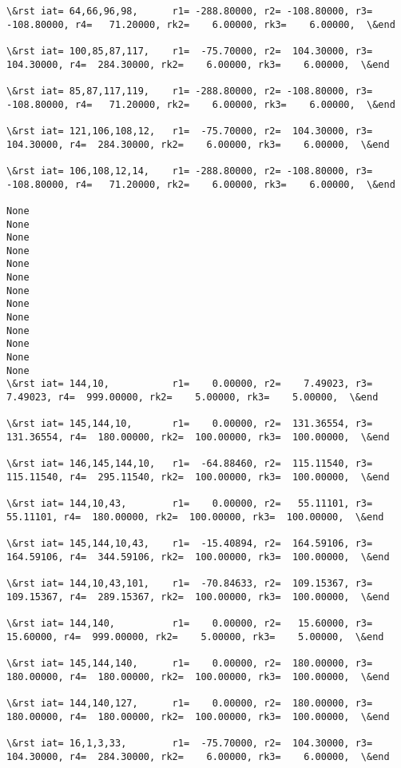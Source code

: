 \documentclass[11pt]{article}
\begin{document}
\begin{Verbatim}[commandchars=\\\{\}]
\&rst iat= 64,66,96,98,      r1= -288.80000, r2= -108.80000, r3= -108.80000, r4=   71.20000, rk2=    6.00000, rk3=    6.00000,  \&end

\&rst iat= 100,85,87,117,    r1=  -75.70000, r2=  104.30000, r3=  104.30000, r4=  284.30000, rk2=    6.00000, rk3=    6.00000,  \&end

\&rst iat= 85,87,117,119,    r1= -288.80000, r2= -108.80000, r3= -108.80000, r4=   71.20000, rk2=    6.00000, rk3=    6.00000,  \&end

\&rst iat= 121,106,108,12,   r1=  -75.70000, r2=  104.30000, r3=  104.30000, r4=  284.30000, rk2=    6.00000, rk3=    6.00000,  \&end

\&rst iat= 106,108,12,14,    r1= -288.80000, r2= -108.80000, r3= -108.80000, r4=   71.20000, rk2=    6.00000, rk3=    6.00000,  \&end

None
None
None
None
None
None
None
None
None
None
None
None
None
\&rst iat= 144,10,           r1=    0.00000, r2=    7.49023, r3=    7.49023, r4=  999.00000, rk2=    5.00000, rk3=    5.00000,  \&end

\&rst iat= 145,144,10,       r1=    0.00000, r2=  131.36554, r3=  131.36554, r4=  180.00000, rk2=  100.00000, rk3=  100.00000,  \&end

\&rst iat= 146,145,144,10,   r1=  -64.88460, r2=  115.11540, r3=  115.11540, r4=  295.11540, rk2=  100.00000, rk3=  100.00000,  \&end

\&rst iat= 144,10,43,        r1=    0.00000, r2=   55.11101, r3=   55.11101, r4=  180.00000, rk2=  100.00000, rk3=  100.00000,  \&end

\&rst iat= 145,144,10,43,    r1=  -15.40894, r2=  164.59106, r3=  164.59106, r4=  344.59106, rk2=  100.00000, rk3=  100.00000,  \&end

\&rst iat= 144,10,43,101,    r1=  -70.84633, r2=  109.15367, r3=  109.15367, r4=  289.15367, rk2=  100.00000, rk3=  100.00000,  \&end

\&rst iat= 144,140,          r1=    0.00000, r2=   15.60000, r3=   15.60000, r4=  999.00000, rk2=    5.00000, rk3=    5.00000,  \&end

\&rst iat= 145,144,140,      r1=    0.00000, r2=  180.00000, r3=  180.00000, r4=  180.00000, rk2=  100.00000, rk3=  100.00000,  \&end

\&rst iat= 144,140,127,      r1=    0.00000, r2=  180.00000, r3=  180.00000, r4=  180.00000, rk2=  100.00000, rk3=  100.00000,  \&end

\&rst iat= 16,1,3,33,        r1=  -75.70000, r2=  104.30000, r3=  104.30000, r4=  284.30000, rk2=    6.00000, rk3=    6.00000,  \&end


\end{Verbatim}
\end{document}
